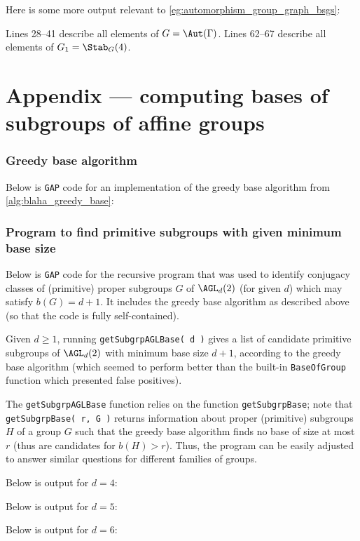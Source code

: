 Here is some more output relevant to \autoref{eg:automorphism_group_graph_bsgs}:\label{app:automorphism_group_graph_bsgs}



Lines 28--41 describe all elements of $G = \Aut(\Gamma)$. Lines 62--67 describe all elements of $G_1 = \Stab_G(4)$.

\chapter{Appendix --- computing bases of subgroups of affine groups}%

\subsection{Greedy base algorithm}

Below is \texttt{GAP} code for an implementation of the greedy base algorithm from \autoref{alg:blaha_greedy_base}:



\subsection{Program to find primitive subgroups with given minimum base size}

Below is \texttt{GAP} code for the recursive program that was used to identify conjugacy classes of (primitive) proper subgroups $G$ of $\AGL_d(2)$ (for given $d$) which may satisfy $b(G) = d + 1$. It includes the greedy base algorithm as described above (so that the code is fully self-contained).

Given $d \geq 1$, running \texttt{getSubgrpAGLBase( d )} gives a list of candidate primitive subgroups of $\AGL_d(2)$ with minimum base size $d + 1$, according to the greedy base algorithm (which seemed to perform better than the built-in \texttt{BaseOfGroup} function which presented false positives).

The \texttt{getSubgrpAGLBase} function relies on the function \texttt{getSubgrpBase}; note that \texttt{getSubgrpBase( r, G )} returns information about proper (primitive) subgroups $H$ of a group $G$ such that the greedy base algorithm finds no base of size at most $r$ (thus are candidates for $b(H) > r$). Thus, the program can be easily adjusted to answer similar questions for different families of groups.



Below is output for $d = 4$:



Below is output for $d = 5$:



Below is output for $d = 6$:



% 